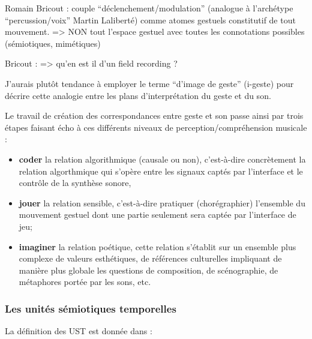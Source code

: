 Romain Bricout : couple ``déclenchement/modulation'' (analogue à l'archétype ``percussion/voix'' Martin Laliberté) comme atomes gestuels constitutif de tout mouvement. => NON tout l'espace gestuel avec toutes les connotations possibles (sémiotiques, mimétiques)

Bricout :
=> qu'en est il d'un field recording ?

J'aurais plutôt tendance à employer le terme ``d'image de geste'' (i-geste) pour décrire cette analogie entre les plans d'interprétation du geste et du son.

Le travail de création des correspondances entre geste et son passe ainsi par trois étapes faisant écho à ces différents niveaux de perception/compréhension musicale :
\vspace{-1em}
\begin{itemize}[noitemsep]
\item \textbf{coder} la relation algorithmique (causale ou non), c'est-à-dire concrètement la relation algorthmique qui s'opère entre les signaux captés par l'interface et le contrôle de la synthèse sonore, 
\item\textbf{jouer} la relation sensible, c'est-à-dire pratiquer (chorégraphier) l'ensemble du mouvement gestuel dont une partie seulement sera captée par l'interface de jeu;
\item\textbf{imaginer} la relation poétique, cette relation s'établit sur un ensemble plus complexe de valeurs esthétiques, de références culturelles impliquant de manière plus globale les questions de composition, de scénographie, de métaphores portée par les sons, etc.
\end{itemize}




\subsubsection{Les unités sémiotiques temporelles}

La définition des UST est donnée dans \cite{timsit-berthier_les_2004}:



